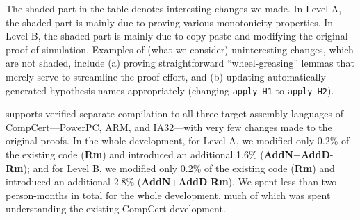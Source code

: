 The shaded part in the table denotes interesting changes we made.  In
Level A, the shaded part is mainly due to proving various monotonicity
properties. In Level B, the shaded part is mainly due to
copy-paste-and-modifying the original proof of simulation.  Examples of
(what we consider) uninteresting changes, which are not shaded,
include (a) proving straightforward ``wheel-greasing'' lemmas that
merely serve to streamline the proof effort, and (b) updating
automatically generated hypothesis names appropriately (\eg changing
\texttt{apply H1} to \texttt{apply H2}).

\sepcomp{} supports verified separate compilation to all three target
assembly languages of CompCert---PowerPC, ARM, and IA32---with very
few changes made to the original proofs. In the whole development, for
Level A, we modified only 0.2\% of the existing code (\textbf{Rm}) and
introduced an additional 1.6\%
(\textbf{AddN}+\textbf{AddD}-\textbf{Rm}); and for Level B, we
modified only 0.2\% of the existing code (\textbf{Rm}) and introduced
an additional 2.8\% (\textbf{AddN}+\textbf{AddD}-\textbf{Rm}).  We
spent less than two person-months in total for the whole development,
much of which was spent understanding the existing CompCert
development.



